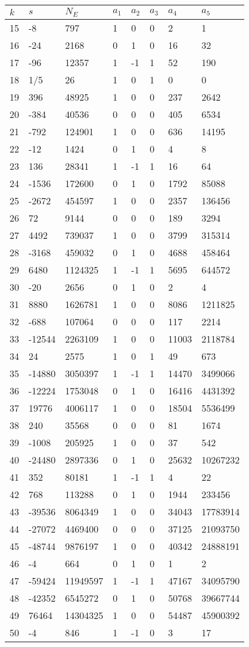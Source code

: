 \documentclass{amsart}
\begin{document}
\begin{longtable}{|l|l|l|lllll|}
\hline
$k$ & $s$ & $N_E$ & $a_1$ & $a_2$ & $a_3$ & $a_4$ & $a_5$\\
\hline
15&-8&797&1&0&0&2&1\\
16&-24&2168&0&1&0&16&32\\
17&-96&12357&1&-1&1&52&190\\
18&1/5&26&1&0&1&0&0\\
19&396&48925&1&0&0&237&2642\\
20&-384&40536&0&0&0&405&6534\\
21&-792&124901&1&0&0&636&14195\\
22&-12&1424&0&1&0&4&8\\
23&136&28341&1&-1&1&16&64\\
24&-1536&172600&0&1&0&1792&85088\\
25&-2672&454597&1&0&0&2357&136456\\
26&72&9144&0&0&0&189&3294\\
27&4492&739037&1&0&0&3799&315314\\
28&-3168&459032&0&1&0&4688&458464\\
29&6480&1124325&1&-1&1&5695&644572\\
30&-20&2656&0&1&0&2&4\\
31&8880&1626781&1&0&0&8086&1211825\\
32&-688&107064&0&0&0&117&2214\\
33&-12544&2263109&1&0&0&11003&2118784\\
34&24&2575&1&0&1&49&673\\
35&-14880&3050397&1&-1&1&14470&3499066\\
36&-12224&1753048&0&1&0&16416&4431392\\
37&19776&4006117&1&0&0&18504&5536499\\
38&240&35568&0&0&0&81&1674\\
39&-1008&205925&1&0&0&37&542\\
40&-24480&2897336&0&1&0&25632&10267232\\
41&352&80181&1&-1&1&4&22\\
42&768&113288&0&1&0&1944&233456\\
43&-39536&8064349&1&0&0&34043&17783914\\
44&-27072&4469400&0&0&0&37125&21093750\\
45&-48744&9876197&1&0&0&40342&24888191\\
46&-4&664&0&1&0&1&2\\
47&-59424&11949597&1&-1&1&47167&34095790\\
48&-42352&6545272&0&1&0&50768&39667744\\
49&76464&14304325&1&0&0&54487&45900392\\
50&-4&846&1&-1&0&3&17\\
\hline
\end{longtable}
\end{document}
